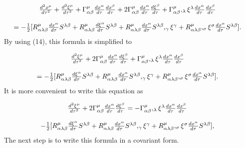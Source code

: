 \documentclass[a4paper,12pt]{article}
\begin{document}
\begin{equation}
\begin{array}{c}
\frac{d^{2}x^{\mu }}{d\tau ^{2}}+\frac{d^{2}\xi ^{\mu }}{d\tau ^{2}}+\Gamma
_{\alpha \beta }^{\mu }\frac{dx^{\alpha }}{d\tau }\frac{dx^{\beta }}{d\tau }%
+2\Gamma _{\alpha \beta }^{\mu }\frac{dx^{\alpha }}{d\tau }\frac{d\xi
^{\beta }}{d\tau }+\Gamma _{\alpha \beta }^{\mu },_{\lambda }\xi ^{\lambda }%
\frac{dx^{\alpha }}{d\tau }\frac{dx^{\beta }}{d\tau } \\ 
\\ 
=-\frac{1}{2}[R_{\alpha \lambda \beta }^{\mu }\frac{dx^{\alpha }}{d\tau }%
S^{\lambda \beta }+R_{\alpha \lambda \beta }^{\mu }\frac{d\xi ^{\alpha }}{%
d\tau }S^{\lambda \beta }+R_{\alpha \lambda \beta }^{\mu }\frac{dx^{\alpha }%
}{d\tau }S^{\lambda \beta },_{\gamma }\xi ^{\gamma }+R_{\alpha \lambda \beta
}^{\mu },_{\sigma }\xi ^{\sigma }\frac{dx^{\alpha }}{d\tau }S^{\lambda \beta
}].
\end{array}
\label{20}
\end{equation}
By using (14), this formula is simplified to

\begin{equation}
\begin{array}{c}
\frac{d^{2}\xi ^{\mu }}{d\tau ^{2}}+2\Gamma _{\alpha \beta }^{\mu }\frac{%
dx^{\alpha }}{d\tau }\frac{d\xi ^{\beta }}{d\tau }+\Gamma _{\alpha \beta
}^{\mu },_{\lambda }\xi ^{\lambda }\frac{dx^{\alpha }}{d\tau }\frac{%
dx^{\beta }}{d\tau } \\ 
\\ 
=-\frac{1}{2}[R_{\alpha \lambda \beta }^{\mu }\frac{d\xi ^{\alpha }}{d\tau }%
S^{\lambda \beta }+R_{\alpha \lambda \beta }^{\mu }\frac{dx^{\alpha }}{d\tau 
}S^{\lambda \beta },_{\gamma }\xi ^{\gamma }+R_{\alpha \lambda \beta }^{\mu
},_{\sigma }\xi ^{\sigma }\frac{dx^{\alpha }}{d\tau }S^{\lambda \beta }].
\end{array}
\label{21}
\end{equation}
It is more convenient to write this equation as

\begin{equation}
\begin{array}{c}
\frac{d^{2}\xi ^{\mu }}{d\tau ^{2}}+2\Gamma _{\alpha \beta }^{\mu }\frac{%
dx^{\alpha }}{d\tau }\frac{d\xi ^{\beta }}{d\tau }=-\Gamma _{\alpha \beta
}^{\mu },_{\lambda }\xi ^{\lambda }\frac{dx^{\alpha }}{d\tau }\frac{%
dx^{\beta }}{d\tau } \\ 
\\ 
-\frac{1}{2}[R_{\alpha \lambda \beta }^{\mu }\frac{d\xi ^{\alpha }}{d\tau }%
S^{\lambda \beta }+R_{\alpha \lambda \beta }^{\mu }\frac{dx^{\alpha }}{d\tau 
}S^{\lambda \beta },_{\gamma }\xi ^{\gamma }+R_{\alpha \lambda \beta }^{\mu
},_{\sigma }\xi ^{\sigma }\frac{dx^{\alpha }}{d\tau }S^{\lambda \beta }],
\end{array}
\label{22}
\end{equation}
The next step is to write this formula in a covariant form.
\end{document}
